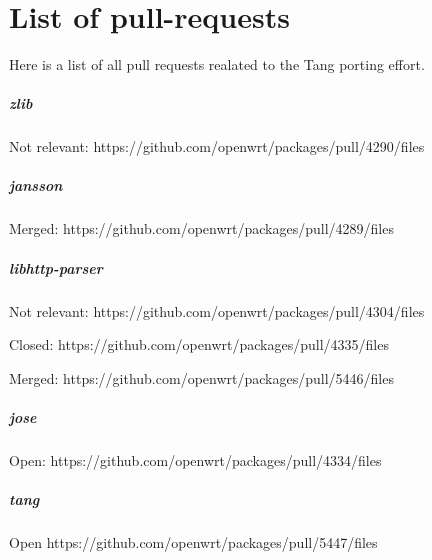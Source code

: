 \chapter{List of pull-requests}\label{diffs}
Here is a list of all pull requests realated to the Tang porting effort.

\paragraph{zlib}

Not relevant:
https://github.com/openwrt/packages/pull/4290/files

\paragraph{jansson}

Merged:
https://github.com/openwrt/packages/pull/4289/files

\paragraph{libhttp-parser}

Not relevant:
https://github.com/openwrt/packages/pull/4304/files

Closed:
https://github.com/openwrt/packages/pull/4335/files

Merged:
https://github.com/openwrt/packages/pull/5446/files


\paragraph{jose}

Open:
https://github.com/openwrt/packages/pull/4334/files

\paragraph{tang}

Open
https://github.com/openwrt/packages/pull/5447/files
